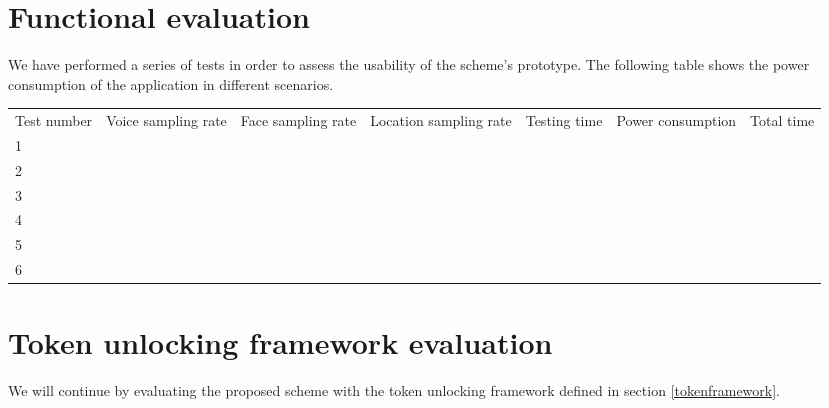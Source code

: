 \section{Functional evaluation}
\label{functionaleval}
We have performed a series of tests in order to assess the usability of the scheme's prototype. The following table shows the power consumption of the application in different scenarios.

\begin{table}
    \begin{tabular}{lllllll}
    Test number & Voice sampling rate & Face sampling rate & Location sampling rate & Testing time & Power consumption & Total time \\
    1           & ~                   & ~                  & ~                      & ~            & ~                 & ~          \\
    2           & ~                   & ~                  & ~                      & ~            & ~                 & ~          \\
    3           & ~                   & ~                  & ~                      & ~            & ~                 & ~          \\
    4           & ~                   & ~                  & ~                      & ~            & ~                 & ~          \\
    5           & ~                   & ~                  & ~                      & ~            & ~                 & ~          \\
    6           & ~                   & ~                  & ~                      & ~            & ~                 & ~          \\
    \end{tabular}
\end{table}

\section{Token unlocking framework evaluation}
We will continue by evaluating the proposed scheme with the token unlocking framework defined in section \ref{tokenframework}. 

